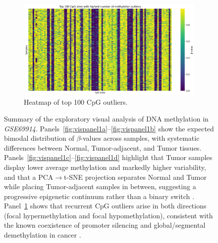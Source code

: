 \documentclass[10pt]{extarticle}
\begin{document}
\begin{figure}[H]
    \vspace{1em}

    \begin{subfigure}[t]{0.98\textwidth}
        \centering
        \includegraphics[height=\panelheight, width=0.98\linewidth, keepaspectratio]{Figures/plot_2_2_Heatmap_of_top_100_CpG_sites_with_the_highest_number_of_outliers.png}
        \caption{Heatmap of top 100 CpG outliers.}
        \label{fig:vispanel1e}
    \end{subfigure}

    \caption{
    Summary of the exploratory visual analysis of DNA methylation in \textit{GSE69914}.
    Panels~\ref{fig:vispanel1a}--\ref{fig:vispanel1b} show the expected bimodal distribution of $\beta$-values across samples, with systematic differences between Normal, Tumor-adjacent, and Tumor tissues.
    Panels~\ref{fig:vispanel1c}--\ref{fig:vispanel1d} highlight that Tumor samples display lower average methylation and markedly higher variability, and that a PCA$\rightarrow$t-SNE projection separates Normal and Tumor while placing Tumor-adjacent samples in between, suggesting a progressive epigenetic continuum rather than a binary switch \cite{ref12,ref13,ref15,ref16}.
    Panel~\ref{fig:vispanel1e} shows that recurrent CpG outliers arise in both directions (focal hypermethylation and focal hypomethylation), consistent with the known coexistence of promoter silencing and global/segmental demethylation in cancer \cite{ref8,ref11}.}
    \label{fig:vispanel}
\end{figure}
\end{document}
